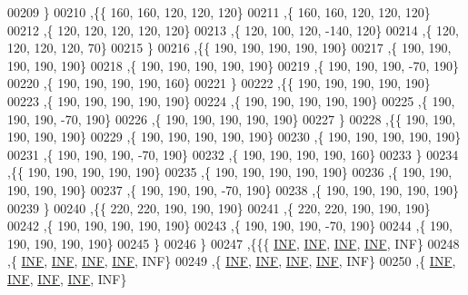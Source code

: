 \begin{DoxyCode}
00209   \}
00210  ,\{\{   160,   160,   120,   120,   120\}
00211   ,\{   160,   160,   120,   120,   120\}
00212   ,\{   120,   120,   120,   120,   120\}
00213   ,\{   120,   100,   120,  -140,   120\}
00214   ,\{   120,   120,   120,   120,    70\}
00215   \}
00216  ,\{\{   190,   190,   190,   190,   190\}
00217   ,\{   190,   190,   190,   190,   190\}
00218   ,\{   190,   190,   190,   190,   190\}
00219   ,\{   190,   190,   190,   -70,   190\}
00220   ,\{   190,   190,   190,   190,   160\}
00221   \}
00222  ,\{\{   190,   190,   190,   190,   190\}
00223   ,\{   190,   190,   190,   190,   190\}
00224   ,\{   190,   190,   190,   190,   190\}
00225   ,\{   190,   190,   190,   -70,   190\}
00226   ,\{   190,   190,   190,   190,   190\}
00227   \}
00228  ,\{\{   190,   190,   190,   190,   190\}
00229   ,\{   190,   190,   190,   190,   190\}
00230   ,\{   190,   190,   190,   190,   190\}
00231   ,\{   190,   190,   190,   -70,   190\}
00232   ,\{   190,   190,   190,   190,   160\}
00233   \}
00234  ,\{\{   190,   190,   190,   190,   190\}
00235   ,\{   190,   190,   190,   190,   190\}
00236   ,\{   190,   190,   190,   190,   190\}
00237   ,\{   190,   190,   190,   -70,   190\}
00238   ,\{   190,   190,   190,   190,   190\}
00239   \}
00240  ,\{\{   220,   220,   190,   190,   190\}
00241   ,\{   220,   220,   190,   190,   190\}
00242   ,\{   190,   190,   190,   190,   190\}
00243   ,\{   190,   190,   190,   -70,   190\}
00244   ,\{   190,   190,   190,   190,   190\}
00245   \}
00246  \}
00247 ,\{\{\{   \hyperlink{constants_8h_a12c2040f25d8e3a7b9e1c2024c618cb6}{INF},   \hyperlink{constants_8h_a12c2040f25d8e3a7b9e1c2024c618cb6}{INF},   \hyperlink{constants_8h_a12c2040f25d8e3a7b9e1c2024c618cb6}{INF},   \hyperlink{constants_8h_a12c2040f25d8e3a7b9e1c2024c618cb6}{INF},   INF\}
00248   ,\{   \hyperlink{constants_8h_a12c2040f25d8e3a7b9e1c2024c618cb6}{INF},   \hyperlink{constants_8h_a12c2040f25d8e3a7b9e1c2024c618cb6}{INF},   \hyperlink{constants_8h_a12c2040f25d8e3a7b9e1c2024c618cb6}{INF},   \hyperlink{constants_8h_a12c2040f25d8e3a7b9e1c2024c618cb6}{INF},   INF\}
00249   ,\{   \hyperlink{constants_8h_a12c2040f25d8e3a7b9e1c2024c618cb6}{INF},   \hyperlink{constants_8h_a12c2040f25d8e3a7b9e1c2024c618cb6}{INF},   \hyperlink{constants_8h_a12c2040f25d8e3a7b9e1c2024c618cb6}{INF},   \hyperlink{constants_8h_a12c2040f25d8e3a7b9e1c2024c618cb6}{INF},   INF\}
00250   ,\{   \hyperlink{constants_8h_a12c2040f25d8e3a7b9e1c2024c618cb6}{INF},   \hyperlink{constants_8h_a12c2040f25d8e3a7b9e1c2024c618cb6}{INF},   \hyperlink{constants_8h_a12c2040f25d8e3a7b9e1c2024c618cb6}{INF},   \hyperlink{constants_8h_a12c2040f25d8e3a7b9e1c2024c618cb6}{INF},   INF\}

\end{DoxyCode}
